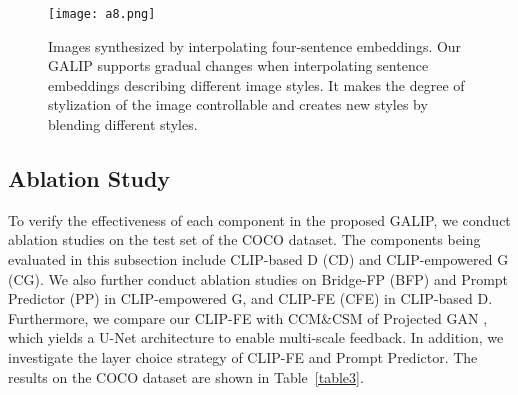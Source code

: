 \documentclass[10pt,twocolumn,letterpaper]{article}
\begin{document}
\begin{figure}[t] \small
  \centering
  \texttt{[image: a8.png]}
  \caption{Images synthesized by interpolating four-sentence embeddings. Our GALIP supports gradual changes when interpolating sentence embeddings describing different image styles. It makes the degree of stylization of the image controllable and creates new styles by blending different styles.}
  \label{fig7}
  \vspace{-0.4cm}
\end{figure}


\subsection{Ablation Study}

To verify the effectiveness of each component in the proposed GALIP, we conduct ablation studies on the test set of the COCO dataset.
The components being evaluated in this subsection include CLIP-based D (CD) and CLIP-empowered G (CG). 
We also further conduct ablation studies on Bridge-FP (BFP) and Prompt Predictor (PP) in CLIP-empowered G, and CLIP-FE (CFE) in CLIP-based D.
Furthermore, we compare our CLIP-FE with CCM\&CSM of Projected GAN \cite{sauer2021projected}, which yields a U-Net architecture to enable multi-scale feedback. 
In addition, we investigate the layer choice strategy of CLIP-FE and Prompt Predictor. 
The results on the COCO dataset are shown in Table~\ref{table3}.
\end{document}
